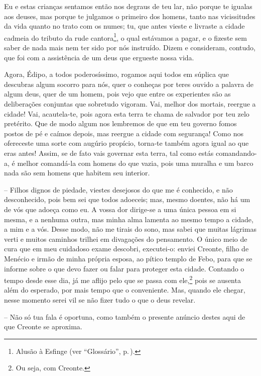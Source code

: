  Eu e estas crianças sentamos então nos degraus de teu lar, não
porque te igualas aos deuses, mas porque te julgamos o primeiro dos
homens, tanto nas vicissitudes da vida quanto no trato com os numes; tu,
que antes vieste e livraste a cidade cadmeia do tributo da rude
cantora\footnote{Alusão à Esfinge (ver ``Glossário'', p.\,\pageref{glossario}).}, o qual estávamos a
pagar, e o fizeste sem saber de nada mais nem ter sido por nós
instruído. Dizem e consideram, contudo, que foi com a assistência de um
deus que ergueste nossa vida.

 Agora, Édipo, a todos poderosíssimo, rogamos aqui todos em súplica
que descubras algum socorro para nós, quer o conheças por teres ouvido a
palavra de algum deus, quer de um homem, pois vejo que entre os
experientes são as deliberações conjuntas que sobretudo vigoram. Vai,
melhor dos mortais, reergue a cidade! Vai, acautela-te, pois agora esta
terra te chama de salvador por teu zelo pretérito. Que de  modo
algum nos lembremos de que em teu governo fomos postos de pé e caímos
depois, mas reergue a cidade com segurança! Como nos ofereceste uma
sorte com augúrio propício, torna-te também agora igual ao que eras
antes! Assim, se de fato vais governar esta terra, tal como estás
comandando-a, é melhor comandá-la com homens do que vazia, pois uma
muralha e um barco nada são sem homens que habitem seu interior.

 --   Filhos dignos de piedade, viestes desejosos do que me é conhecido, e não
 desconhecido, pois bem sei que todos adoeceis; mas, mesmo doentes,
não há um de vós que adoeça como eu. A vossa dor dirige-se a uma única
pessoa em si mesma, e a nenhuma outra, mas minha alma lamenta ao mesmo
tempo a cidade, a mim e a vós. Desse modo, não me tirais do sono, mas
sabei que muitas lágrimas verti e muitos caminhos trilhei em divagações
do pensamento. O único meio de cura que em meu cuidadoso  exame
descobri, executei-o: enviei Creonte, filho de Menécio e irmão de minha
própria esposa, ao pítico templo de Febo, para que se informe sobre o
que devo fazer ou falar para proteger esta cidade. Contando o tempo
desde esse dia, já me aflijo pelo que se passa com ele,\footnote{Ou seja,
  com Creonte.} pois se ausenta além do esperado, por mais tempo que o
conveniente. Mas, quando ele chegar, nesse momento serei vil se não
fizer tudo o que o deus revelar.

 --   Não só tua fala é oportuna, como também o presente anúncio destes aqui
de que Creonte se aproxima.

